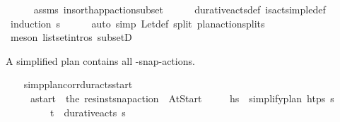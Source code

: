 \begin{isabellebody}
%
\isadelimproof
\ \ \ \ %
\endisadelimproof
%
\isatagproof
{}\isamarkupfalse%
\ assms\ insort{\isacharunderscore}{\kern0pt}happ{\isacharunderscore}{\kern0pt}action{\isacharunderscore}{\kern0pt}subset\isanewline
\ \ \ \ \isamarkupfalse%
\ durative{\isacharunderscore}{\kern0pt}acts{\isacharunderscore}{\kern0pt}def\ is{\isacharunderscore}{\kern0pt}act{\isacharunderscore}{\kern0pt}simple{\isacharunderscore}{\kern0pt}def\isanewline
\ \ \ \ \isamarkupfalse%
\ {\isacharparenleft}{\kern0pt}induction\ {\isasympi}s{\isacharparenright}{\kern0pt}\isanewline
\ \ \ \ \isamarkupfalse%
\ {\isacharparenleft}{\kern0pt}auto\ simp{\isacharcolon}{\kern0pt}\ Let{\isacharunderscore}{\kern0pt}def\ split{\isacharcolon}{\kern0pt}\ plan{\isacharunderscore}{\kern0pt}action{\isachardot}{\kern0pt}splits{\isacharparenright}{\kern0pt}\isanewline
\ \ \ \ \isamarkupfalse%
\ {\isacharparenleft}{\kern0pt}meson\ list{\isachardot}{\kern0pt}set{\isacharunderscore}{\kern0pt}intros{\isacharparenleft}{\kern0pt}{}{\isacharparenright}{\kern0pt}\ subsetD{\isacharparenright}{\kern0pt}\isanewline
\ \ \ \ \isamarkupfalse%
%
\endisatagproof
{\isafoldproof}%
%
\isadelimproof
%
\endisadelimproof
%
\begin{isamarkuptext}%
A simplified plan contains all -snap-actions.%
\end{isamarkuptext}\isamarkuptrue%
\ \ \isamarkupfalse%
\ simp{\isacharunderscore}{\kern0pt}plan{\isacharunderscore}{\kern0pt}corr{\isacharunderscore}{\kern0pt}dur{\isacharunderscore}{\kern0pt}acts{\isacharunderscore}{\kern0pt}start{\isacharcolon}{\kern0pt}\ \isanewline
\ \ \ \ \ {\isasympi}\isanewline
\ \ \ \ \ {\isachardoublequoteopen}a\isactrlsub s\isactrlsub t\isactrlsub a\isactrlsub r\isactrlsub t\ {\isasymequiv}\ the\ {\isacharparenleft}{\kern0pt}res{\isacharunderscore}{\kern0pt}inst{\isacharunderscore}{\kern0pt}snap{\isacharunderscore}{\kern0pt}action\ {\isasympi}\ At{\isacharunderscore}{\kern0pt}Start{\isacharparenright}{\kern0pt}{\isachardoublequoteclose}\isanewline
\ \ \ \ \ {\isachardoublequoteopen}hs\ {\isacharequal}{\kern0pt}\ simplify{\isacharunderscore}{\kern0pt}plan\ htps\ {\isasympi}s{\isachardoublequoteclose}\ \isanewline
\ \ \ \ \ \ \ \ \ {\isachardoublequoteopen}{\isacharparenleft}{\kern0pt}t\isactrlsub {\isasympi}{\isacharcomma}{\kern0pt}{\isasympi}{\isacharparenright}{\kern0pt}\ {\isasymin}\ durative{\isacharunderscore}{\kern0pt}acts\ {\isasympi}s{\isachardoublequoteclose}\isanewline

\end{isabellebody}
